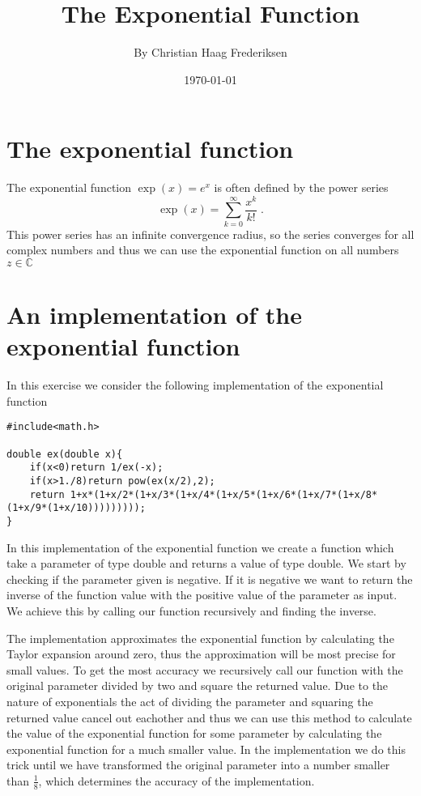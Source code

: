 \documentclass[twocolumn]{article}
\title{\textbf{The Exponential Function}}
\author{By Christian Haag Frederiksen}
\date{\today}
\begin{document}
\maketitle

\section{The exponential function}
The exponential function $\exp(x) = e^{x}$ is often defined by the power series
\begin{equation}\label{eq:power}
	\exp(x) = \sum_{k=0}^\infty \frac{x^k}{k!} \;.
\end{equation}
This power series has an infinite convergence radius, so the series converges for all complex numbers and thus we can use the exponential function on all numbers $z \in \mathbb{C}$

\section{An implementation of the exponential function}
In this exercise we consider the following implementation of the exponential function

\begin{lstlisting}
#include<math.h>

double ex(double x){
    if(x<0)return 1/ex(-x);
    if(x>1./8)return pow(ex(x/2),2);
    return 1+x*(1+x/2*(1+x/3*(1+x/4*(1+x/5*(1+x/6*(1+x/7*(1+x/8*(1+x/9*(1+x/10)))))))));
}

\end{lstlisting}
In this implementation of the exponential function we create a function which take a parameter of type double and returns a value of type double.
We start by checking if the parameter given is negative. If it is negative we want to return the inverse of the function value with the positive value of the parameter as input. We achieve this by calling our function recursively and finding the inverse.

The implementation approximates the exponential function by calculating the Taylor expansion around zero, thus the approximation will be most precise for small values. To get the most accuracy we recursively call our function with the original parameter divided by two and square the returned value. Due to the nature of exponentials the act of dividing the parameter and squaring the returned value cancel out eachother and thus we can use this method to calculate the value of the exponential function for some parameter by calculating the exponential function for a much smaller value. In the implementation we do this trick until we have transformed the original parameter into a number smaller than $\frac{1}{8}$, which determines the accuracy of the implementation.
\end{document}
